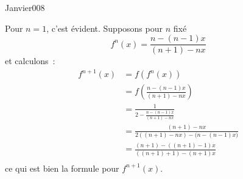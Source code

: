 \begin{corrige}{Janvier008}

Pour $n = 1$, c'est évident. Supposons pour $n$ fixé
\begin{equation*}
f^n(x) = \frac{n - (n-1)x}{(n+1)-nx}
\end{equation*}
et calculons~:
\begin{equation*}
  \begin{split}
    f^{n+1}(x) &= f(f^n(x))\\
    &= f\left(\frac{n -
        (n-1)x}{(n+1)-nx}\right)\\
    &= \frac1{2 - \frac{n - (n-1)x}{(n+1)-nx}}\\
    &= \frac{(n+1)-nx}{2{((n+1)-nx)} - {(n - (n-1)x})}\\
    &= \frac{(n+1)-((n+1) - 1)x}{((n+1)+1)-(n+1)x}\\
  \end{split}
\end{equation*}
ce qui est bien la formule pour $f^{n+1}(x)$.

\end{corrige}
